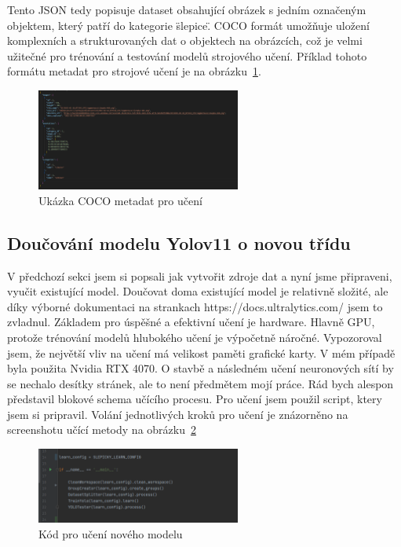 Tento JSON tedy popisuje dataset obsahující obrázek s jedním označeným objektem, který patří do kategorie \"slepice\".
COCO formát umožňuje uložení komplexních a strukturovaných dat o objektech na obrázcích, což je velmi užitečné pro trénování a testování modelů strojového učení.
Příklad tohoto formátu metadat pro strojové učení je na obrázku~\ref{fig:coco_format}.

\begin{figure}[htbp]
    \centering
    \includegraphics[width=0.6\textwidth]{img/coco_format}
    \caption{Ukázka COCO metadat pro učení}
    \label{fig:coco_format}
\end{figure}

\subsection*{Doučování modelu Yolov11 o novou třídu}\label{subsec:doucovani-modelu-yolov11-o-novou-tridu}
V předchozí sekci jsem si popsali jak vytvořit zdroje dat a nyní jsme připraveni, vyučit existující model.
Doučovat doma existující model je relativně složité, ale díky výborné dokumentaci na strankach https://docs.ultralytics.com/ jsem to zvladnul.
Základem pro úspěšné a efektivní učení je hardware.
Hlavně GPU, protože trénování modelů hlubokého učení je výpočetně náročné.
Vypozoroval jsem, že největší vliv na učení má velikost paměti grafické karty.
V mém případě byla použita Nvidia RTX 4070.
O stavbě a následném učení neuronových sítí by se nechalo desítky stránek, ale to není předmětem mojí práce.
Rád bych alespon představil blokové schema učícího procesu.\newline
\newline
Pro učení jsem použil script, ktery jsem si pripravil.
Volání jednotlivých kroků pro učení je znázorněno na screenshotu učící metody na obrázku~\ref{fig:learn_script}

\begin{figure}[htbp]
    \centering
    \includegraphics[width=0.6\textwidth]{img/learn_script}
    \caption{Kód pro učení nového modelu}
    \label{fig:learn_script}
\end{figure}

